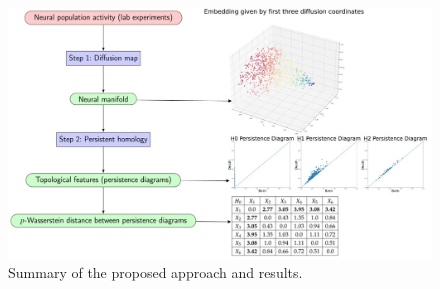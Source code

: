 \documentclass[11pt]{article}
\begin{document}
     

\begin{figure}[H]
\centering
\includegraphics[width=5.5in]{flowchart.jpg}
\caption{Summary of the proposed approach and results.}
\label{fig_sim}
\end{figure}


%
\end{document}
